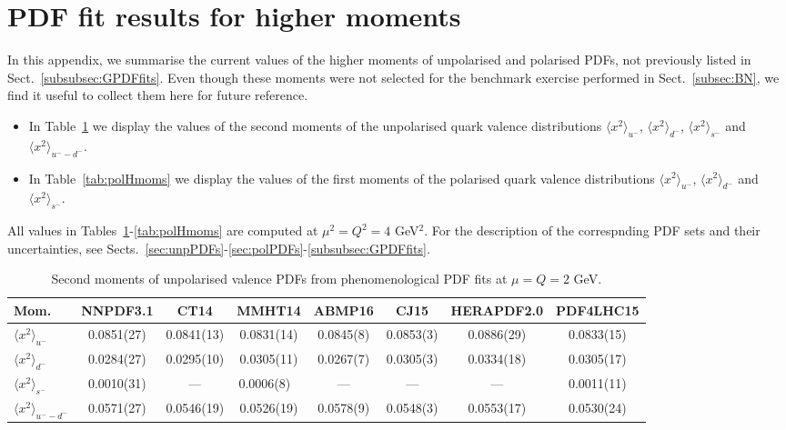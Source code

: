 \section{PDF fit results for higher moments }
\label{app:Hmoms}

In this appendix, we summarise the current values of the higher moments of unpolarised 
and polarised PDFs, not previously listed in Sect.~\ref{subsubsec:GPDFfits}.
%
Even though these moments were not selected for the benchmark exercise performed in
Sect.~\ref{subsec:BN}, we find it useful to collect them here for future reference.

\begin{itemize}

\item In Table~\ref{tab:unpHmoms} we display the values of the second moments of the 
unpolarised quark valence distributions $\langle x^2\rangle_{u^-}$, 
$\langle x^2\rangle_{d^-}$, $\langle x^2\rangle_{s^-}$ and $\langle x^2\rangle_{u^--d^-}$.

\item In Table~\ref{tab:polHmoms} we display the values of the first moments of the 
polarised quark valence distributions $\langle x^2\rangle_{u^-}$, 
$\langle x^2\rangle_{d^-}$ and $\langle x^2\rangle_{s^-}$.

\end{itemize}
%
All values in Tables~\ref{tab:unpHmoms}-\ref{tab:polHmoms} are computed at 
$\mu^2=Q^2=4$ GeV$^2$.
%
For the description of the correspnding PDF sets and their uncertainties, see
Sects.~\ref{sec:unpPDFs}-\ref{sec:polPDFs}-\ref{subsubsec:GPDFfits}.

\begin{table}[!t]
\centering
\small
\begin{tabular}{lccccccc}
\toprule
Mom. & NNPDF3.1 & CT14 & MMHT14 & ABMP16 & CJ15 & HERAPDF2.0 & PDF4LHC15 \\
\midrule
$\langle x^2\rangle_{u^-}$ 
& 0.0851(27) & 0.0841(13) & 0.0831(14)    & 0.0845(8) & 0.0853(3) & 0.0886(29) & 0.0833(15) \\
$\langle x^2\rangle_{d^-}$
& 0.0284(27) & 0.0295(10) & 0.0305(11)    & 0.0267(7) & 0.0305(3) & 0.0334(18) & 0.0305(17) \\ 
$\langle x^2\rangle_{s^-}$
& 0.0010(31) & ---        & 0.0006(8)\ \, & ---       & ---       & ---        & 0.0011(11) \\
$\langle x^2\rangle_{u^--d^-}$
& 0.0571(27) & 0.0546(19) & 0.0526(19)    & 0.0578(9) & 0.0548(3) & 0.0553(17) & 0.0530(24) \\
\bottomrule
\end{tabular}
\caption{\small Second moments of unpolarised valence PDFs from phenomenological PDF fits
at $\mu=Q=2$ GeV.}
\label{tab:unpHmoms}
\end{table}

